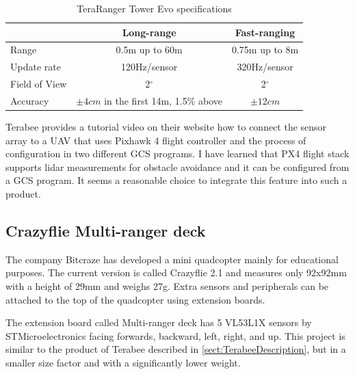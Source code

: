 \begin{table}[ht]
	\footnotesize
	\centering
	\begin{tabular}{ l c c }
		\toprule
		                & Long-range                                & Fast-ranging \\
		\midrule
		Range           & 0.5m up to 60m                            & 0.75m up to 8m \\
		Update rate     & 120Hz/sensor                              & 320Hz/sensor\\
		Field of View   & 2$^{\circ}$                               & 2$^{\circ}$\\
		Accuracy        & $\pm 4cm$ in the first 14m, 1.5\% above   & $\pm 12cm$\\
		\bottomrule
	\end{tabular}
	\caption{TeraRanger Tower Evo specifications}
	\label{tab:tera_ranger_features}
\end{table}

Terabee provides a tutorial video on their website\cite{TerabeeTeraRanger} how to connect the 
sensor array to a UAV that uses Pixhawk 4 flight controller and the process of configuration 
in two different GCS programs. I have learned that PX4 flight stack supports lidar measurements
for obstacle avoidance and it can be configured from a GCS program. It seems a reasonable choice 
to integrate this feature into such a product.

\subsection{Crazyflie Multi-ranger deck}
The company Bitcraze has developed a mini quadcopter mainly for educational purposes. The current version is
called Crazyflie 2.1 and measures only 92x92mm with a height of 29mm and weighs 27g.
Extra sensors and peripherals can be attached to the top of the quadcopter using extension boards.

The extension board called Multi-ranger deck has 5 VL53L1X sensors by STMicroelectronics facing forwards, 
backward, left, right, and up. This project is similar to the product of Terabee described in \ref{sect:TerabeeDescription}, 
but in a smaller size factor and with a significantly lower weight.

